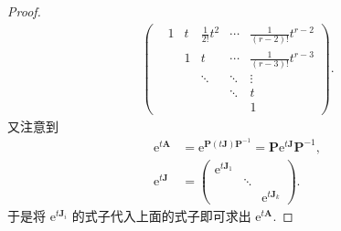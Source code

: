 \documentclass[../../main.tex]{subfiles}
\begin{document}
\begin{proof}
\begin{align*}
\begin{pmatrix}
 & 1 & t & \frac{1}{2!}t^2 & \cdots & \frac{1}{(r - 2)!}t^{r - 2} \\
 & & 1 & t & \cdots & \frac{1}{(r - 3)!}t^{r - 3} \\
 & & & \ddots & \ddots & \vdots \\
 & & & & \ddots & t \\
 & & & & & 1
\end{pmatrix}.
\end{align*}
又注意到
\begin{align*}
\mathrm{e}^{t\boldsymbol{A}}&=\mathrm{e}^{\boldsymbol{P}(t\boldsymbol{J})\boldsymbol{P}^{-1}}=\boldsymbol{P}\mathrm{e}^{t\boldsymbol{J}}\boldsymbol{P}^{-1},\\
\mathrm{e}^{t\boldsymbol{J}}&=\begin{pmatrix}
\mathrm{e}^{t\boldsymbol{J}_1} & & \\
 & \ddots & \\
 & & \mathrm{e}^{t\boldsymbol{J}_k}
\end{pmatrix}.
\end{align*}
于是将 $\mathrm{e}^{t\boldsymbol{J}_i}$ 的式子代入上面的式子即可求出 $\mathrm{e}^{t\boldsymbol{A}}$. 
\end{proof}
\end{document}
